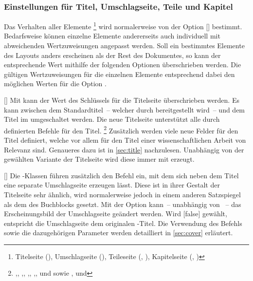 \subsubsection{Einstellungen für Titel, Umschlagseite, Teile und Kapitel}
Das Verhalten aller Elemente%
\footnote{%
  Titelseite (), Umschlagseite (),
  Teileseite (, ),
  Kapitelseite (, )%
}
wird normalerweise von der Option [\PSet] bestimmt. Bedarfsweise 
können einzelne Elemente andererseits auch individuell mit abweichenden 
Wertzuweisungen angepasst werden. Soll ein bestimmtes Elemente des Layouts 
anders erscheinen als der Rest des Dokumentes, so kann der entsprechende Wert 
mithilfe der folgenden Optionen überschrieben werden. Die gültigen 
Wertzuweisungen für die einzelnen Elemente entsprechend dabei den möglichen 
Werten für die Option .

\begin{Declaration}{[\PSet]}
\printdeclarationlist%
%
%
Mit  kann der Wert des Schlüssels  für die 
Titelseite überschrieben werden. Es kann zwischen dem Standardtitel~-- welcher 
durch \KOMAScript{} bereitgestellt wird~-- und dem Titel im \CD umgeschaltet 
werden. Die neue Titelseite unterstützt alle durch \KOMAScript{} definierten 
Befehle für den Titel.%
\footnote{\raggedright%
  ,,
  ,,
  ,,
  ,,
   und  sowie
  ,
  und 
}
Zusätzlich werden viele neue Felder für den Titel definiert, welche vor allem 
für den Titel einer wissenschaftlichen Arbeit von Relevanz sind. Genaueres dazu 
ist in \autoref{sec:title} nachzulesen. Unabhängig von der gewählten Variante 
der Titelseite wird diese immer mit  erzeugt.
\end{Declaration}

\begin{Declaration}[v2.02]{[\PSet]}
\printdeclarationlist%
%
%
%
Die \TUDScript-Klassen führen zusätzlich den Befehl  ein, mit 
dem sich neben dem Titel eine separate Umschlagseite erzeugen lässt. Diese ist 
in ihrer Gestalt der Titelseite sehr ähnlich, wird normalerweise jedoch in 
einem anderen Satzspiegel als dem des Buchblocks gesetzt. Mit der Option 
 kann~-- unabhängig von ~-- das Erscheinungsbild 
der Umschlagseite geändert werden. Wird [false] gewählt, 
entspricht die Umschlagseite dem originalen \KOMAScript-Titel. Die Verwendung 
des Befehls  sowie die dazugehörigen Parameter werden 
detailliert in \autoref{sec:cover} erläutert.
\end{Declaration}


